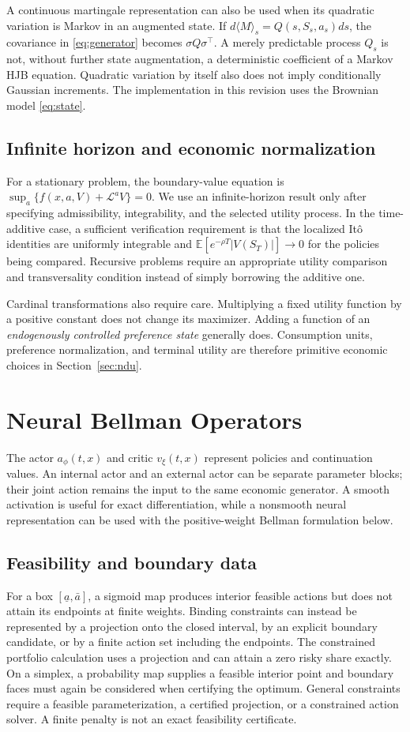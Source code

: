 \documentclass[ecta,draft]{econsocart}
\theoremstyle{definition}
\theoremstyle{remark}
\newcommand{\E}{\mathbb E}
\newcommand{\LL}{\mathcal L}
\begin{document}
A continuous martingale representation can also be used when its quadratic variation is Markov in an augmented state. If $d\langle M\rangle_s=Q(s,S_s,a_s)ds$, the covariance in \eqref{eq:generator} becomes $\sigma Q\sigma^\top$. A merely predictable process $Q_s$ is not, without further state augmentation, a deterministic coefficient of a Markov HJB equation. Quadratic variation by itself also does not imply conditionally Gaussian increments. The implementation in this revision uses the Brownian model \eqref{eq:state}.

\subsection{Infinite horizon and economic normalization}
For a stationary problem, the boundary-value equation is $\sup_a\{f(x,a,V)+\LL^aV\}=0$. We use an infinite-horizon result only after specifying admissibility, integrability, and the selected utility process. In the time-additive case, a sufficient verification requirement is that the localized It\^o identities are uniformly integrable and $\E[e^{-\rho T}|V(S_T)|]\to0$ for the policies being compared. Recursive problems require an appropriate utility comparison and transversality condition instead of simply borrowing the additive one.

Cardinal transformations also require care. Multiplying a fixed utility function by a positive constant does not change its maximizer. Adding a function of an \emph{endogenously controlled preference state} generally does. Consumption units, preference normalization, and terminal utility are therefore primitive economic choices in Section~\ref{sec:ndu}.

\section{Neural Bellman Operators}\label{sec:method}
The actor $a_\phi(t,x)$ and critic $v_\xi(t,x)$ represent policies and continuation values. An internal actor and an external actor can be separate parameter blocks; their joint action remains the input to the same economic generator. A smooth activation is useful for exact differentiation, while a nonsmooth neural representation can be used with the positive-weight Bellman formulation below.

\subsection{Feasibility and boundary data}
For a box $[\underline a,\bar a]$, a sigmoid map produces interior feasible actions but does not attain its endpoints at finite weights. Binding constraints can instead be represented by a projection onto the closed interval, by an explicit boundary candidate, or by a finite action set including the endpoints. The constrained portfolio calculation uses a projection and can attain a zero risky share exactly. On a simplex, a probability map supplies a feasible interior point and boundary faces must again be considered when certifying the optimum. General constraints require a feasible parameterization, a certified projection, or a constrained action solver. A finite penalty is not an exact feasibility certificate.
\end{document}
